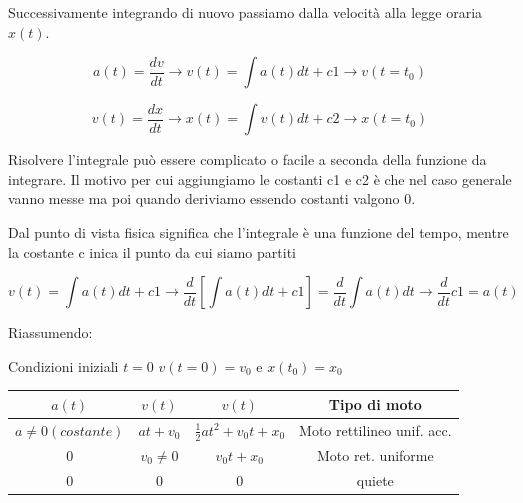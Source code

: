 Successivamente integrando di nuovo passiamo dalla velocità alla 
legge oraria $x(t)$.

\begin{equation}
    a(t)=\frac{dv}{dt} \rightarrow v(t)= \int {a(t) dt} +c1 \rightarrow v(t=t_0)
\end{equation}

\begin{equation}
    v(t)=\frac{dx}{dt} \rightarrow x(t)= \int {v(t)dt} +c2 \rightarrow x(t=t_0)
\end{equation}


 Risolvere l'integrale può essere complicato o facile a seconda della funzione
 da integrare.
Il motivo per cui aggiungiamo le costanti c1 e c2 è
che nel caso generale vanno messe ma poi quando deriviamo 
essendo costanti valgono $0$.

Dal punto di vista fisica significa che l'integrale è una
funzione del tempo, mentre la costante c inica il punto da cui siamo
partiti

\begin{equation}
   v(t)= \int {a(t)dt} +c1 \rightarrow 
   \frac{d}{dt}[\int{a(t)dt}+c1]=
   \frac{d}{dt}\int{a(t)dt}\rightarrow \frac{d}{dt}c1=a(t)
\end{equation}

Riassumendo:

Condizioni iniziali $t=0$
$v(t=0)=v_0$ e $x(t_0)=x_0$

\begin{center}
    \begin{tabular}{ |c|c|c|c| } 
     \hline
     $a(t)$ & $v(t)$ & $v(t)$ & Tipo di moto \\ 
     \hline
        $a\neq 0 (costante)$ & $at+v_0$ & $\frac{1}{2}at^2+v_0t+x_0$ & Moto rettilineo unif. acc. \\ 
     $0$ & $v_0 \neq 0$ & $v_0t+x_0$ & Moto ret. uniforme \\ 
     $0$ & $0$ & $0$ & quiete \\
     \hline
    \end{tabular}
\end{center}
